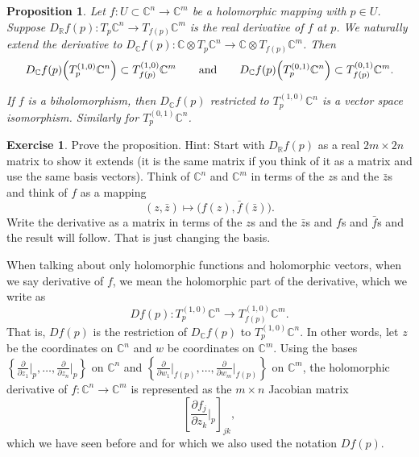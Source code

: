 \documentclass[12pt,openany]{book}
\newcommand{\C}{{\mathbb{C}}}
\newcommand{\R}{{\mathbb{R}}}
\theoremstyle{plain}
\newtheorem{prop}[thm]{Proposition}
\theoremstyle{remark}
\theoremstyle{definition}
\newenvironment{exbox}{%
    \def\FrameCommand{\vrule width 1pt \relax\hspace{10pt}}%
    \MakeFramed {\advance \hsize -\width \FrameRestore}%
}{%
    \endMakeFramed
}
\theoremstyle{exercise}
\newtheorem{exercise}{Exercise}[section]
\theoremstyle{example}
\begin{document}
\begin{prop} \label{prop:holvectmap}
Let $f \colon U \subset \C^n \to \C^m$ be a holomorphic mapping with
$p \in U$.
Suppose 
$D_\R f(p) \colon T_p\C^n \to T_{f(p)} \C^m$
is the real derivative of $f$ at $p$.
%
We naturally
extend the derivative to $D_\C f(p) \colon \C \otimes T_p\C^n \to \C \otimes  T_{f(p)}
\C^m$.  Then
\begin{equation*}
D_\C f(p)\Bigl(T_p^{(1,0)} \C^n\Bigr) \subset T_{f(p)}^{(1,0)} \C^m
\qquad \text{and} \qquad
D_\C f(p)\Bigl(T_p^{(0,1)} \C^n\Bigr) \subset T_{f(p)}^{(0,1)} \C^m .
\end{equation*}

If $f$ is a biholomorphism, then $D_\C f(p)$ restricted to $T_p^{(1,0)} \C^n$
is a vector space isomorphism.  Similarly for $T_p^{(0,1)} \C^n$.
\end{prop}

\begin{exbox}
\begin{exercise}
Prove the proposition.
Hint: Start with $D_\R f(p)$ as a real $2m \times 2n$ matrix to show it
extends (it is the same matrix if you think of it as a matrix
and use the same basis vectors).
Think of $\C^n$ and $\C^m$ in terms of the $z$s and the
$\bar{z}$s and think of $f$ as a mapping
\begin{equation*}
(z,\bar{z}) \mapsto \bigl( f(z) , \bar{f}(\bar{z}) \bigr) .
\end{equation*}
Write the derivative as a matrix in terms of the $z$s and the $\bar{z}$s
and $f$s and $\bar{f}$s and the result will follow.  That is just changing
the basis.
\end{exercise}
\end{exbox}

When talking about only holomorphic functions and holomorphic vectors,
when we say derivative of $f$, we mean the holomorphic part of the
derivative, which we write as
%
\begin{equation*}
D f(p) \colon T_p^{(1,0)} \C^n \to T_{f(p)}^{(1,0)} \C^m .
\end{equation*}
That is, $Df(p)$ is the restriction of $D_\C f(p)$ to $T_p^{(1,0)} \C^n$.
In other words, let $z$ be the coordinates on $\C^n$ and
$w$ be coordinates on $\C^m$.
Using the bases
$\left\{ \frac{\partial}{\partial z_1} \big|_p,\ldots,
\frac{\partial}{\partial z_n} \big|_p \right\}$
on $\C^n$ and 
$\left\{ \frac{\partial}{\partial w_1} \big|_{f(p)},\ldots,
\frac{\partial}{\partial w_m} \big|_{f(p)} \right\}$ on $\C^m$,
the holomorphic derivative of $f \colon \C^{n} \to \C^m$ is represented
as the $m \times n$ Jacobian matrix
\begin{equation*}
\left[
\frac{\partial f_j}{\partial z_k} \Big|_p
\right]_{jk} ,
\end{equation*}
which we have seen before and for which we also used the notation 
$Df(p)$.
\end{document}
